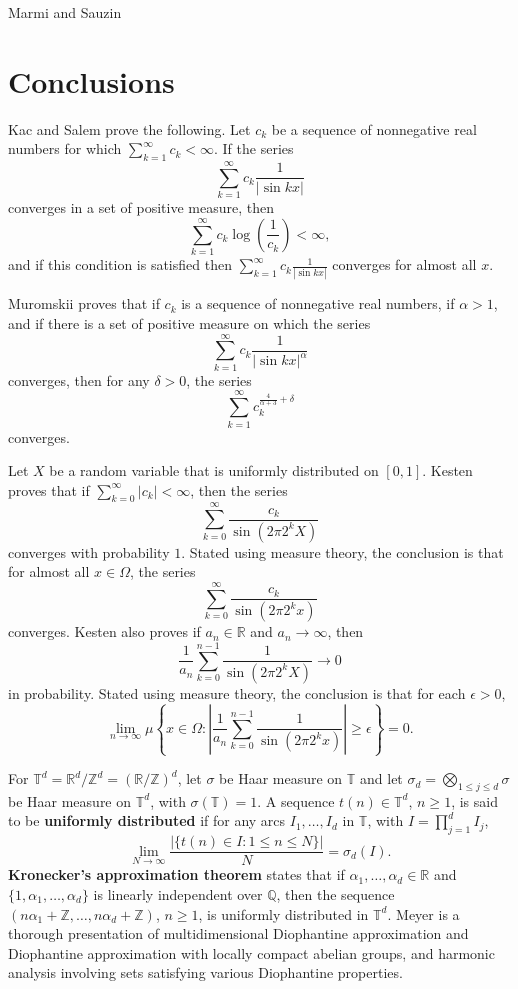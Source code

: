 \documentclass{article}
\begin{document}
Marmi and Sauzin \cite{sauzin}

\section{Conclusions}
Kac and Salem \cite{MR0089284} prove the following. Let $c_k$ be a sequence of nonnegative real numbers for which 
$\sum_{k=1}^\infty c_k<\infty$. If the series
 \[
 \sum_{k=1}^\infty c_k \frac{1}{|\sin kx|}
 \]
 converges in a set of positive measure, then
 \[
 \sum_{k=1}^\infty c_k \log\left( \frac{1}{c_k} \right)<\infty,
 \]
 and if this condition is satisfied then $ \sum_{k=1}^\infty c_k \frac{1}{|\sin kx|}$ converges for almost all $x$.

Muromskii \cite[p.~54, Theorem 1]{MR0161081} proves that if $c_k$ is a sequence of nonnegative real numbers,  if $\alpha>1$,
 and if there is a set of positive measure on which the series
 \[
 \sum_{k=1}^\infty c_k \frac{1}{|\sin kx|^\alpha}
 \]
 converges, then for any $\delta>0$, the series
 \[
 \sum_{k=1}^\infty c_k^{\frac{4}{\alpha+3}+\delta}
 \]
 converges. 

Let $X$ be a random variable that is uniformly distributed on $[0,1]$. Kesten \cite[p.~111, Theorem 1 ]{MR0104640} proves that
 if $\sum_{k=0}^\infty |c_k|<\infty$, then the series
 \[
 \sum_{k=0}^\infty \frac{c_k}{\sin (2\pi 2^k X)}
 \]
 converges with probability $1$. Stated using measure theory, the conclusion is that for almost all $x \in \Omega$, the series 
 \[
  \sum_{k=0}^\infty \frac{c_k}{\sin (2\pi 2^k x)}
 \]
 converges. Kesten \cite[p.~114, Theorem 3]{MR0104640} also proves if $a_n \in \mathbb{R}$ and $a_n \to \infty$, then
 \[
 \frac{1}{a_n} \sum_{k=0}^{n-1} \frac{1}{\sin(2\pi 2^k X)} \to 0
 \]
 in probability. Stated using measure theory, the conclusion is that for each $\epsilon>0$,
 \[
 \lim_{n \to \infty} \mu\left\{x \in \Omega: \left|  \frac{1}{a_n} \sum_{k=0}^{n-1} \frac{1}{\sin(2\pi 2^k x)} \right| \geq \epsilon \right\} =0.
 \]
 
For $\mathbb{T}^d = \mathbb{R}^d / \mathbb{Z}^d = (\mathbb{R}/\mathbb{Z})^d$, 
let $\sigma$ be Haar measure on $\mathbb{T}$ and let $\sigma_d=\bigotimes_{1 \leq j \leq d} \sigma$ be Haar measure on $\mathbb{T}^d$, with $\sigma(\mathbb{T})=1$.
A sequence $t(n) \in \mathbb{T}^d$, $n \geq 1$,
is said to be \textbf{uniformly distributed} if for any arcs $I_1,\ldots,I_d$ in $\mathbb{T}$, with $I=\prod_{j=1}^d I_j$,
\[
\lim_{N \to \infty} \frac{|\{t(n) \in I : 1 \leq n \leq N\}|}{N} = \sigma_d(I).
\]
\textbf{Kronecker's approximation theorem} \cite[p.~108, Theorem 6.3]{travaglini} states that if
$\alpha_1,\ldots,\alpha_d \in \mathbb{R}$ and $\{1,\alpha_1,\ldots,\alpha_d\}$ is linearly independent over $\mathbb{Q}$,
then the sequence $(n\alpha_1+\mathbb{Z},\ldots,n\alpha_d+\mathbb{Z})$, $n \geq 1$, is uniformly distributed in $\mathbb{T}^d$.
Meyer \cite{meyer} is
a thorough presentation of
multidimensional Diophantine approximation and Diophantine approximation with locally compact abelian groups, and harmonic
analysis involving sets satisfying various Diophantine properties.
\end{document}
